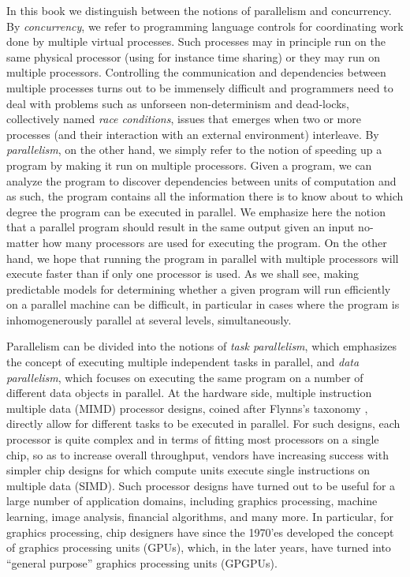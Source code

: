 \documentclass[oneside,11pt]{book}
\begin{document}
In this book we distinguish between the notions of parallelism and
concurrency. By \emph{concurrency}, we refer to programming language
controls for coordinating work done by multiple virtual
processes. Such processes may in principle run on the same physical
processor (using for instance time sharing) or they may run on
multiple processors. Controlling the communication and dependencies
between multiple processes turns out to be immensely difficult and
programmers need to deal with problems such as unforseen
non-determinism and dead-locks, collectively named \emph{race
  conditions}, issues that emerges when two or more processes (and
their interaction with an external environment) interleave. By
\emph{parallelism}, on the other hand, we simply refer to the notion
of speeding up a program by making it run on multiple
processors. Given a program, we can analyze the program to discover
dependencies between units of computation and as such, the program
contains all the information there is to know about to which degree
the program can be executed in parallel. We emphasize here the notion
that a parallel program should result in the same output given an
input no-matter how many processors are used for executing the
program. On the other hand, we hope that running the program in
parallel with multiple processors will execute faster than if only one
processor is used. As we shall see, making predictable models for
determining whether a given program will run efficiently on a parallel
machine can be difficult, in particular in cases where the program is
inhomogenerously parallel at several levels, simultaneously.

Parallelism can be divided into the notions of \emph{task
  parallelism}, which emphasizes the concept of executing multiple
independent tasks in parallel, and \emph{data parallelism}, which
focuses on executing the same program on a number of different data
objects in parallel. At the hardware side, multiple instruction
multiple data (MIMD) processor designs, coined after Flynns's taxonomy
\cite{Flynn1972}, directly allow for different tasks to be executed in
parallel. For such designs, each processor is quite complex and in
terms of fitting most processors on a single chip, so as to increase
overall throughput, vendors have increasing success with simpler chip
designs for which compute units execute single instructions on
multiple data (SIMD). Such processor designs have turned out to be
useful for a large number of application domains, including graphics
processing, machine learning, image analysis, financial algorithms,
and many more. In particular, for graphics processing, chip designers
have since the 1970'es developed the concept of graphics processing
units (GPUs), which, in the later years, have turned into ``general
purpose'' graphics processing units (GPGPUs).
\end{document}

